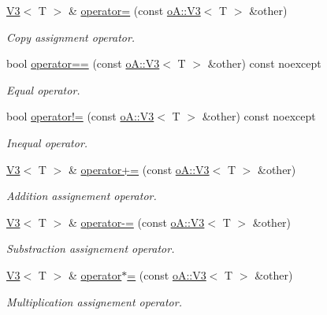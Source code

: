 \begin{DoxyCompactItemize}
\mbox{\hyperlink{structo_a_1_1_v3}{V3}}$<$ T $>$ \& \mbox{\hyperlink{structo_a_1_1_v3_acd2b2489386aa3c917d2b843602da1a8}{operator=}} (const \mbox{\hyperlink{structo_a_1_1_v3}{o\+A\+::\+V3}}$<$ T $>$ \&other)
\begin{DoxyCompactList}\small\item\em Copy assignment operator. \end{DoxyCompactList}\item 
bool \mbox{\hyperlink{structo_a_1_1_v3_a1291b33d742ccbc7e5b30466c6baa50d}{operator==}} (const \mbox{\hyperlink{structo_a_1_1_v3}{o\+A\+::\+V3}}$<$ T $>$ \&other) const noexcept
\begin{DoxyCompactList}\small\item\em Equal operator. \end{DoxyCompactList}\item 
bool \mbox{\hyperlink{structo_a_1_1_v3_ab5f276b206d63965cf0ce028af40363f}{operator!=}} (const \mbox{\hyperlink{structo_a_1_1_v3}{o\+A\+::\+V3}}$<$ T $>$ \&other) const noexcept
\begin{DoxyCompactList}\small\item\em Inequal operator. \end{DoxyCompactList}\item 
\mbox{\hyperlink{structo_a_1_1_v3}{V3}}$<$ T $>$ \& \mbox{\hyperlink{structo_a_1_1_v3_ac69717bc685dc757a3e11566bdc9da00}{operator+=}} (const \mbox{\hyperlink{structo_a_1_1_v3}{o\+A\+::\+V3}}$<$ T $>$ \&other)
\begin{DoxyCompactList}\small\item\em Addition assignement operator. \end{DoxyCompactList}\item 
\mbox{\hyperlink{structo_a_1_1_v3}{V3}}$<$ T $>$ \& \mbox{\hyperlink{structo_a_1_1_v3_a631255b2f80594b99423a807e1846df2}{operator-\/=}} (const \mbox{\hyperlink{structo_a_1_1_v3}{o\+A\+::\+V3}}$<$ T $>$ \&other)
\begin{DoxyCompactList}\small\item\em Substraction assignement operator. \end{DoxyCompactList}\item 
\mbox{\hyperlink{structo_a_1_1_v3}{V3}}$<$ T $>$ \& \mbox{\hyperlink{structo_a_1_1_v3_afa355bab009db6eae651e834cdaf9cc4}{operator$\ast$=}} (const \mbox{\hyperlink{structo_a_1_1_v3}{o\+A\+::\+V3}}$<$ T $>$ \&other)
\begin{DoxyCompactList}\small\item\em Multiplication assignement operator. \end{DoxyCompactList}\item 

\end{DoxyCompactItemize}

